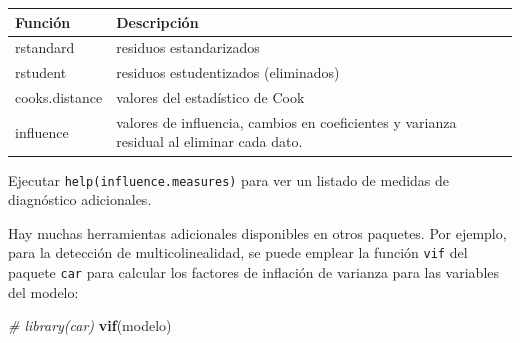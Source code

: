 \documentclass[]{book}
\newenvironment{Shaded}{\begin{snugshade}}{\end{snugshade}}
\newcommand{\KeywordTok}[1]{\textcolor[rgb]{0.13,0.29,0.53}{\textbf{#1}}}
\newcommand{\CommentTok}[1]{\textcolor[rgb]{0.56,0.35,0.01}{\textit{#1}}}
\newcommand{\NormalTok}[1]{#1}
\begin{document}
\begin{longtable}[]{@{}ll@{}}
\toprule
\begin{minipage}[b]{0.10\columnwidth}\raggedright\strut
Función\strut
\end{minipage} & \begin{minipage}[b]{0.82\columnwidth}\raggedright\strut
Descripción\strut
\end{minipage}\tabularnewline
\midrule
\endhead
\begin{minipage}[t]{0.10\columnwidth}\raggedright\strut
rstandard\strut
\end{minipage} & \begin{minipage}[t]{0.82\columnwidth}\raggedright\strut
residuos estandarizados\strut
\end{minipage}\tabularnewline
\begin{minipage}[t]{0.10\columnwidth}\raggedright\strut
rstudent\strut
\end{minipage} & \begin{minipage}[t]{0.82\columnwidth}\raggedright\strut
residuos estudentizados (eliminados)\strut
\end{minipage}\tabularnewline
\begin{minipage}[t]{0.10\columnwidth}\raggedright\strut
cooks.distance\strut
\end{minipage} & \begin{minipage}[t]{0.82\columnwidth}\raggedright\strut
valores del estadístico de Cook\strut
\end{minipage}\tabularnewline
\begin{minipage}[t]{0.10\columnwidth}\raggedright\strut
influence\strut
\end{minipage} & \begin{minipage}[t]{0.82\columnwidth}\raggedright\strut
valores de influencia, cambios en coeficientes y varianza residual al
eliminar cada dato.\strut
\end{minipage}\tabularnewline
\bottomrule
\end{longtable}

Ejecutar \texttt{help(influence.measures)} para ver un listado de
medidas de diagnóstico adicionales.

Hay muchas herramientas adicionales disponibles en otros paquetes. Por
ejemplo, para la detección de multicolinealidad, se puede emplear la
función \texttt{vif} del paquete \texttt{car} para calcular los factores
de inflación de varianza para las variables del modelo:

\begin{Shaded}
\begin{Highlighting}[]
\CommentTok{# library(car)}
\KeywordTok{vif}\NormalTok{(modelo)}
\end{Highlighting}
\end{Shaded}
\end{document}
